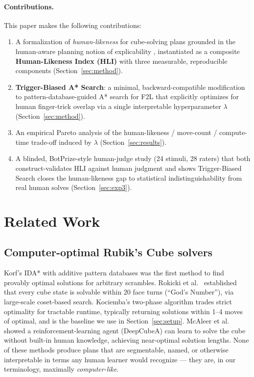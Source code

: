 \documentclass[10pt,conference]{article}
\begin{document}
\paragraph{Contributions.} This paper makes the following contributions:
\begin{enumerate}
  \item A formalization of \emph{human-likeness} for cube-solving
    plans grounded in the human-aware planning notion of
    explicability \citep{kulkarni2016,chakraborti2019}, instantiated
    as a composite \textbf{Human-Likeness Index (HLI)} with three
    measurable, reproducible components (Section~\ref{sec:method}).
  \item \textbf{Trigger-Biased A* Search}: a minimal, backward-compatible
    modification to pattern-database-guided A* search for F2L that
    explicitly optimizes for human finger-trick overlap via a single
    interpretable hyperparameter $\lambda$ (Section~\ref{sec:method}).
  \item An empirical Pareto analysis of the human-likeness /
    move-count / compute-time trade-off induced by $\lambda$
    (Section~\ref{sec:results}).
  \item A blinded, BotPrize-style \citep{hingston2009} human-judge
    study (24 stimuli, 28 raters) that both construct-validates HLI
    against human judgment and shows Trigger-Biased Search closes
    the human-likeness gap to statistical
    indistinguishability from real human solves
    (Section~\ref{sec:exp3}).
\end{enumerate}

\section{Related Work}
\label{sec:related}

\subsection{Computer-optimal Rubik's Cube solvers}
Korf's IDA* with additive pattern databases \citep{korf1997} was the
first method to find provably optimal solutions for arbitrary
scrambles. Rokicki et al.\ \citep{rokicki2014} established that every
cube state is solvable within 20 face turns (``God's Number''), via
large-scale coset-based search. Kociemba's two-phase algorithm
\citep{kociemba} trades strict optimality for tractable runtime,
typically returning solutions within 1--4 moves of optimal, and is
the baseline we use in Section~\ref{sec:setup}. McAleer et al.\
\citep{mcaleer2018} showed a reinforcement-learning agent
(DeepCubeA) can learn to solve the cube without built-in human
knowledge, achieving near-optimal solution lengths. None of these
methods produce plans that are segmentable, named, or otherwise
interpretable in terms any human learner would recognize --- they are,
in our terminology, maximally \emph{computer-like}.
\end{document}
